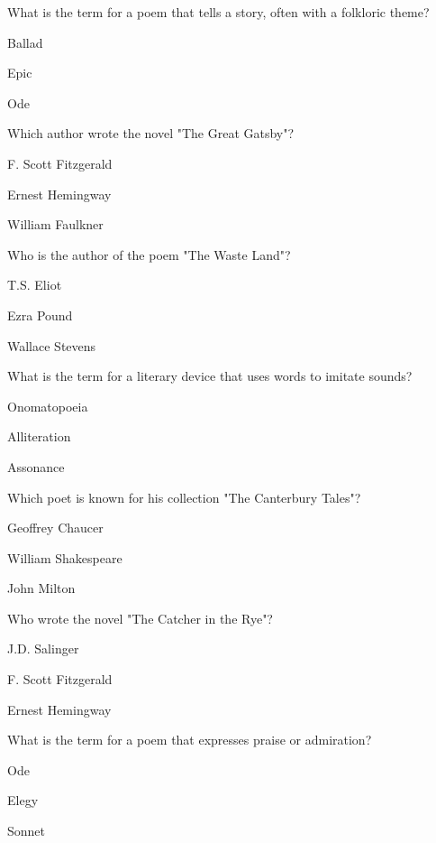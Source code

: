 \begin{enhancedmcq}{What is the term for a poem that tells a story, often with a folkloric theme?}
\item Ballad
\item Epic
\item Ode

\end{enhancedmcq}
\begin{enhancedmcq}{Which author wrote the novel "The Great Gatsby"?}
\item F. Scott Fitzgerald
\item Ernest Hemingway
\item William Faulkner

\end{enhancedmcq}
\begin{enhancedmcq}{Who is the author of the poem "The Waste Land"?}
\item T.S. Eliot
\item Ezra Pound
\item Wallace Stevens

\end{enhancedmcq}
\begin{enhancedmcq}{What is the term for a literary device that uses words to imitate sounds?}
\item Onomatopoeia
\item Alliteration
\item Assonance

\end{enhancedmcq}
\begin{enhancedmcq}{Which poet is known for his collection "The Canterbury Tales"?}
\item Geoffrey Chaucer
\item William Shakespeare
\item John Milton

\end{enhancedmcq}
\begin{enhancedmcq}{Who wrote the novel "The Catcher in the Rye"?}
\item J.D. Salinger
\item F. Scott Fitzgerald
\item Ernest Hemingway

\end{enhancedmcq}
\begin{enhancedmcq}{What is the term for a poem that expresses praise or admiration?}
\item Ode
\item Elegy
\item Sonnet

\end{enhancedmcq}
